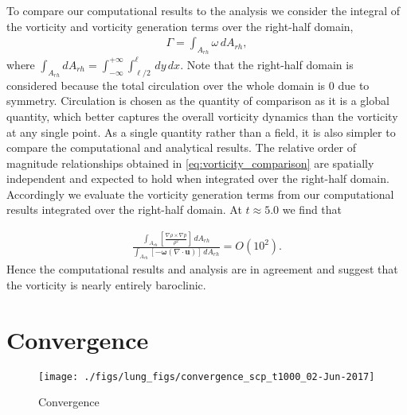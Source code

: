 \documentclass{jfm}%
\newcommand{\orderof}[1]{\ensuremath{\textit{O}\left(#1\right)}}
\begin{document}
To compare our computational results to the analysis we consider the
integral of the vorticity and vorticity generation terms over the
right-half domain,
\begin{align}
  \Gamma = \int_{A_{rh}} \omega \,dA_{rh},
\end{align}
where
$\int_{A_{rh}} dA_{rh} =
\int_{-\infty}^{+\infty}\int_{\ell/2}^{\ell} \,dy\, dx$. Note that
the right-half domain is considered because the total circulation
over the whole domain is $0$ due to symmetry. Circulation is chosen
as the quantity of comparison as it is a global quantity, which
better captures the overall vorticity dynamics than the vorticity at
any single point. As a single quantity rather than a field, it is
also simpler to compare the computational and analytical
results. The relative order of magnitude relationships obtained in
\eqref{eq:vorticity_comparison} are spatially independent and
expected to hold when integrated over the right-half
domain. Accordingly we evaluate the vorticity generation terms from
our computational results integrated over the right-half domain. At
$t\approx5.0$ we find that %
\begin{comment}
  $$ \int_{A_{rh}} \left[\frac{\nabla\rho\times\nabla p}{\rho^2}\right]\,dA_{rh} / \int_{A_{rh}}\left[\left(\boldsymbol{u}\cdot\nabla\right)\boldsymbol{\omega}\right]\,dA_{rh}\approx 285=\orderof{10^2}$$
  and
\end{comment}
\begin{align}
  \frac{\int_{A_{rh}} \left[\frac{\nabla\rho\times\nabla p}{\rho^2}\right]\,dA_{rh}}%
  {\int_{A_{rh}} \left[-\boldsymbol{\omega}\left(\nabla\cdot\boldsymbol{u}\right)\right]%
  \,dA_{rh}}%
  =\orderof{10^2}.
\end{align}
% 
Hence the computational results and analysis are in agreement and
suggest that the vorticity is nearly entirely baroclinic.
% 

\section{Convergence}
\label{sec:convergence}
\begin{figure}
  \centering
  \texttt{[image: ./figs/lung\_figs/convergence\_scp\_t1000\_02-Jun-2017]}
  \caption{Convergence}
  \label{fig:convergence}
\end{figure}




\end{document}

